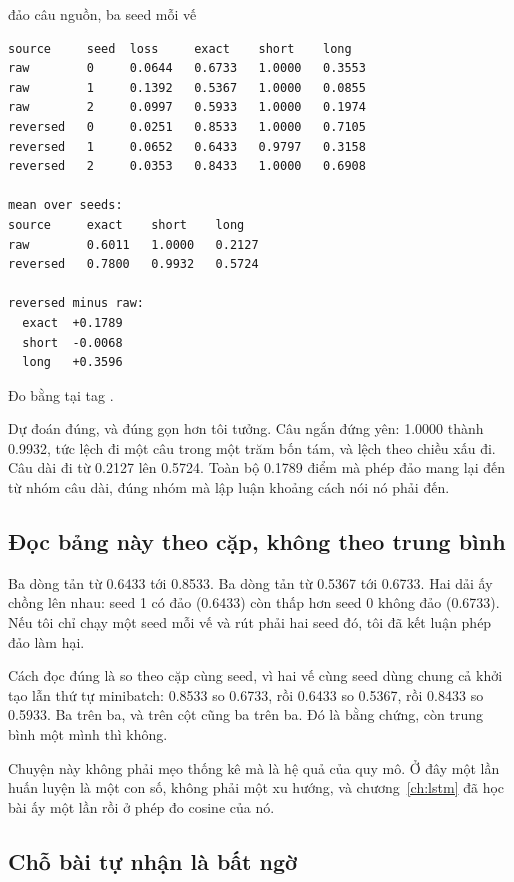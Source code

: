 \begin{measured}{đảo câu nguồn, ba seed mỗi vế}
\begin{verbatim}
source     seed  loss     exact    short    long
raw        0     0.0644   0.6733   1.0000   0.3553
raw        1     0.1392   0.5367   1.0000   0.0855
raw        2     0.0997   0.5933   1.0000   0.1974
reversed   0     0.0251   0.8533   1.0000   0.7105
reversed   1     0.0652   0.6433   0.9797   0.3158
reversed   2     0.0353   0.8433   1.0000   0.6908

mean over seeds:
source     exact    short    long
raw        0.6011   1.0000   0.2127
reversed   0.7800   0.9932   0.5724

reversed minus raw:
  exact  +0.1789
  short  -0.0068
  long   +0.3596
\end{verbatim}

Đo bằng  tại tag .
\end{measured}

%
Dự đoán đúng, và đúng gọn hơn tôi tưởng. Câu ngắn đứng yên: 1.0000 thành 0.9932,
tức lệch đi một câu trong một trăm bốn tám, và lệch theo chiều xấu đi. Câu dài
đi từ 0.2127 lên 0.5724. Toàn bộ 0.1789 điểm mà phép đảo mang lại đến từ nhóm
câu dài, đúng nhóm mà lập luận khoảng cách nói nó phải đến.

\subsection*{Đọc bảng này theo cặp, không theo trung bình}

%
Ba dòng  tản từ 0.6433 tới 0.8533. Ba dòng  tản từ
0.5367 tới 0.6733. Hai dải ấy chồng lên nhau: seed 1 có đảo (0.6433) còn thấp
hơn seed 0 không đảo (0.6733). Nếu tôi chỉ chạy một seed mỗi vế và rút phải hai
seed đó, tôi đã kết luận phép đảo làm hại.

Cách đọc đúng là so theo cặp cùng seed, vì hai vế cùng seed dùng chung cả khởi
tạo lẫn thứ tự minibatch: 0.8533 so 0.6733, rồi 0.6433 so 0.5367, rồi 0.8433 so
0.5933. Ba trên ba, và trên cột  cũng ba trên ba. Đó là bằng chứng,
còn trung bình một mình thì không.

Chuyện này không phải mẹo thống kê mà là hệ quả của quy mô. Ở đây một lần huấn
luyện là một con số, không phải một xu hướng, và chương~\ref{ch:lstm} đã học bài
ấy một lần rồi ở phép đo cosine của nó.

\subsection*{Chỗ bài tự nhận là bất ngờ}

